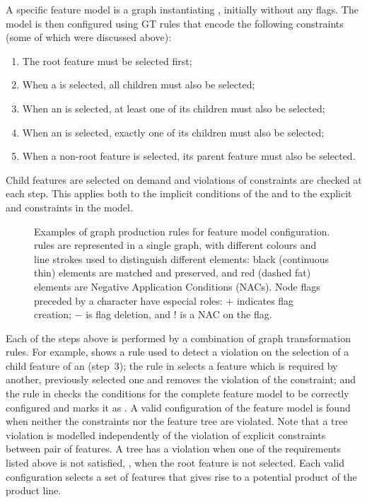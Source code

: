 A specific feature model is a graph instantiating ,
initially without any flags. The model is then configured using GT rules that
encode the following constraints (some of which were discussed above):
%
\begin{enumerate}
\item The root feature must be selected first;
\item When a  is selected, all  children
  must also be selected;
\item When an  is selected, at least one of its children must also be
  selected;
\item When an  is selected, exactly one of its children must also be
  selected; 
\item When a non-root feature is selected, its parent feature must also be
  selected.
\end{enumerate}
%
Child features are selected on demand and violations of constraints are checked
at each step. This applies both to the implicit conditions of the
 and to the explicit  and 
constraints in the model.

\begin{figure}[t]
\centering
  \hspace{1ex}
  \hspace{-3ex}
\caption{Examples of graph production rules for feature model configuration.
\GROOVE rules are represented in a single graph, with different colours and
line strokes used to distinguish different elements: black (continuous thin)
elements are matched and preserved, and red (dashed fat) elements are Negative
Application Conditions (NACs). Node flags preceded by a character have especial
roles: $+$ indicates flag creation; $-$ is flag deletion, and $!$ is a NAC on
the flag.}
\vspace{-6pt}
\end{figure}

Each of the steps above is performed by a combination of graph transformation
rules. For example,  shows a rule used to detect a violation
on the selection of a child feature of an  (step~3); the rule in
 selects a feature which is required by another, previously
selected one and removes the violation of the  constraint; and
the rule in  checks the conditions for the complete feature
model to be correctly configured and marks it as . A valid
configuration of the feature model is found when neither the constraints nor the
feature tree are violated. Note that a tree violation is modelled independently
of the violation of explicit constraints between pair of features. A tree has a
violation when one of the requirements listed above is not satisfied, \eg, when
the root feature is not selected. Each valid configuration selects a set
of features that gives rise to a potential product of the product line.

